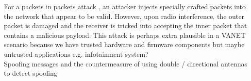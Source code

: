 For a packets in packets attack \cite{goodspeed2011packets}, an attacker injects specially crafted packets into the network that appear to be valid. However, upon radio interference, the outer packet is damaged and the receiver is tricked into accepting the inner packet that contains a malicious payload. This attack is perhaps extra plausible in a VANET scenario because we have trusted hardware and firmware components but maybe untrusted applications e.g. infotainment system?\\

Spoofing messages and the countermeasure of using double / directional antennas to detect spoofing
